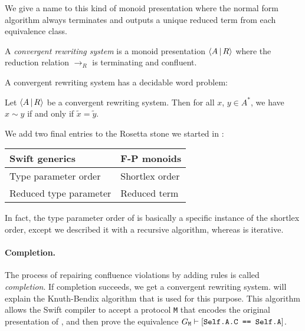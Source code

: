 \documentclass[../generics]{subfiles}
\begin{document}
We give a name to this kind of monoid presentation where the normal form algorithm always terminates and outputs a unique reduced term from each equivalence class.

\begin{definition}
A \emph{convergent rewriting system} is a monoid presentation $\langle A\,|\,R\rangle$ where the reduction relation $\rightarrow_R$ is terminating and confluent.
\end{definition}

A convergent rewriting system has a decidable word problem:

\begin{corollary}\label{convergent decidable}
Let $\langle A\,|\,R\rangle$ be a convergent rewriting system. Then for all $x$, $y\in A^*$, we have $x\sim y$ if and only if $\tilde{x}=\tilde{y}$.
\end{corollary}

We add two final entries to the Rosetta stone we started in :
\begin{center}
\begin{tabular}{ll}
\toprule
\textbf{Swift generics}&\textbf{F-P monoids}\\
\midrule
Type parameter order&Shortlex order\\
Reduced type parameter&Reduced term\\
\bottomrule
\end{tabular}
\end{center}
In fact, the type parameter order of  is basically a specific instance of the shortlex order, except we described it with a recursive algorithm, whereas  is iterative.

\paragraph{Completion.} The process of repairing confluence violations by adding rules is called \emph{completion}. If completion succeeds, we get a convergent rewriting system.  will explain the Knuth-Bendix algorithm that is used for this purpose. This algorithm allows the Swift compiler to accept a protocol \texttt{M} that encodes the original presentation of , and then prove the equivalence $G_\texttt{M}\vdash[\texttt{Self.A.C == Self.A}]$.
\end{document}
